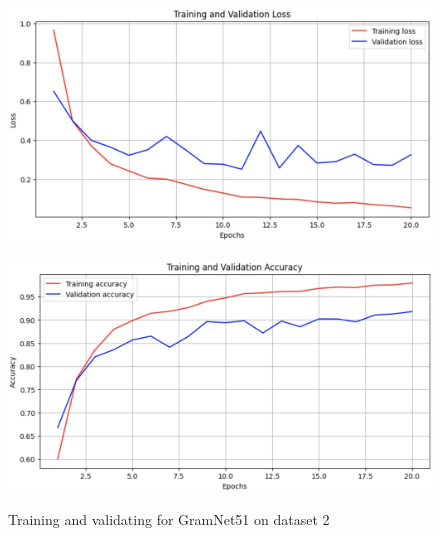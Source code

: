 \documentclass[final]{cvpr}
\begin{document}
\begin{figure}[t]
\centering
\begin{minipage}{0.45\linewidth}
   \includegraphics[width=\linewidth]{images/gramnet51_d2_loss.jpg}
   \label{fig:image1}
\end{minipage}
\hfill
\begin{minipage}{0.45\linewidth}
   \includegraphics[width=\linewidth]{images/gramnet51_d2_acc.jpg}
   \label{fig:image2}
\end{minipage}
\caption{Training and validating for GramNet51 on dataset 2}
\label{fig:gramnet51_d2}
\end{figure}
\end{document}
